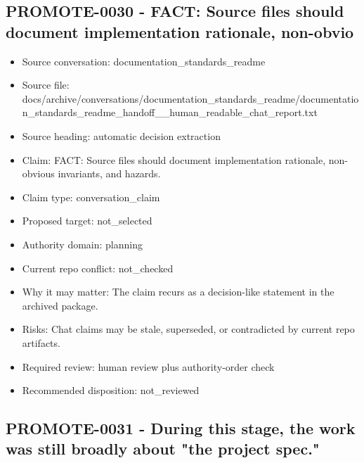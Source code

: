 \documentclass[11pt,a4paper]{report}
\begin{document}
\subsection{PROMOTE-0030 - FACT: Source files should document implementation rationale, non-obvio}

\begin{itemize}
\item Source conversation: documentation\_standards\_readme
\item Source file: docs/archive/conversations/documentation\_standards\_readme/documentation\_standards\_readme\_handoff\_\_human\_readable\_chat\_report.txt
\item Source heading: automatic decision extraction
\item Claim: FACT: Source files should document implementation rationale, non-obvious invariants, and hazards.
\item Claim type: conversation\_claim
\item Proposed target: not\_selected
\item Authority domain: planning
\item Current repo conflict: not\_checked
\item Why it may matter: The claim recurs as a decision-like statement in the archived package.
\item Risks: Chat claims may be stale, superseded, or contradicted by current repo artifacts.
\item Required review: human review plus authority-order check
\item Recommended disposition: not\_reviewed
\end{itemize}

\subsection{PROMOTE-0031 - During this stage, the work was still broadly about "the project spec."}
\end{document}
